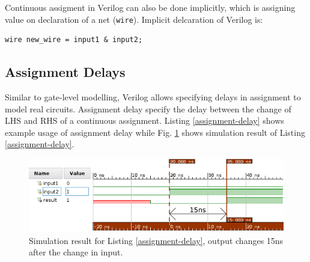 \documentclass[a4paper,10pt]{article}
\theoremstyle{mytheor}
\newcommand{
  \insertverilog}[3]{
  
}
\begin{document}
Continuous assigment in Verilog can also be done implicitly, which is
assigning value on declaration of a net
(\lstinline[style=verilog-inline-style]{wire}). Implicit delcaration
of Verilog is:
\begin{lstlisting}[style=verilog-inline-style,xleftmargin=.25\textwidth]
  wire new_wire = input1 & input2;
\end{lstlisting}

\subsection{Assignment Delays}
Similar to gate-level modelling, Verilog allows specifying delays in
assignment to model real circuits. Assignment delay specify the delay
between the change of LHS and RHS of a continuous assignment. Listing
\ref{assignment-delay} shows example usage of assignment delay while
Fig. \ref{assignment-delay-sim} shows simulation result of Listing
\ref{assignment-delay}.

\insertverilog{./verilog_files/assignmentDelay.v}{assignment-delay}{Using assignment delay in Verilog.}

\begin{figure}[!h] \centering  
  \includegraphics[width=0.8\linewidth]{./resources/assignmentDelay.png}
  \caption{Simulation result for Listing \ref{assignment-delay}, output changes 15ns after the change in input.} 
  \label{assignment-delay-sim}
\end{figure}
\end{document}

